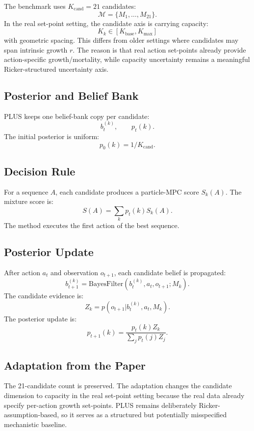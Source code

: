 \documentclass[11pt]{article}
\newcommand{\1}{\mathbf{1}}
\begin{document}
The benchmark uses $K_{\mathrm{cand}}=21$ candidates:
\[
  \mathcal{M}=\{M_1,\ldots,M_{21}\}.
\]
In the real set-point setting, the candidate axis is carrying capacity:
\[
  K_k \in [K_{\mathrm{base}},K_{\max}]
\]
with geometric spacing.  This differs from older settings where candidates may
span intrinsic growth $r$.  The reason is that real action set-points already
provide action-specific growth/mortality, while capacity uncertainty remains a
meaningful Ricker-structured uncertainty axis.

\subsection{Posterior and Belief Bank}

PLUS keeps one belief-bank copy per candidate:
\[
  b_t^{(k)},\qquad p_t(k).
\]
The initial posterior is uniform:
\[
  p_0(k)=1/K_{\mathrm{cand}}.
\]

\subsection{Decision Rule}

For a sequence $A$, each candidate produces a particle-MPC score $S_k(A)$.
The mixture score is:
\[
  S(A)=\sum_k p_t(k)S_k(A).
\]
The method executes the first action of the best sequence.

\subsection{Posterior Update}

After action $a_t$ and observation $o_{t+1}$, each candidate belief is
propagated:
\[
  b_{t+1}^{(k)}=\mathrm{BayesFilter}(b_t^{(k)},a_t,o_{t+1};M_k).
\]
The candidate evidence is:
\[
  Z_k = p(o_{t+1}|b_t^{(k)},a_t,M_k).
\]
The posterior update is:
\[
  p_{t+1}(k)=
  \frac{p_t(k)Z_k}{\sum_jp_t(j)Z_j}.
\]

\subsection{Adaptation from the Paper}

The 21-candidate count is preserved.  The adaptation changes the candidate
dimension to capacity in the real set-point setting because the real data
already specify per-action growth set-points.  PLUS remains deliberately
Ricker-assumption-based, so it serves as a structured but potentially
misspecified mechanistic baseline.
\end{document}
